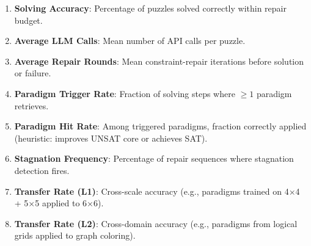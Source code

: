 \begin{enumerate}
    \item \textbf{Solving Accuracy}: Percentage of puzzles solved correctly within repair budget.
    \item \textbf{Average LLM Calls}: Mean number of API calls per puzzle.
    \item \textbf{Average Repair Rounds}: Mean constraint-repair iterations before solution or failure.
    \item \textbf{Paradigm Trigger Rate}: Fraction of solving steps where $\geq 1$ paradigm retrieves.
    \item \textbf{Paradigm Hit Rate}: Among triggered paradigms, fraction correctly applied (heuristic: improves UNSAT core or achieves SAT).
    \item \textbf{Stagnation Frequency}: Percentage of repair sequences where stagnation detection fires.
    \item \textbf{Transfer Rate (L1)}: Cross-scale accuracy (e.g., paradigms trained on 4$\times$4 + 5$\times$5 applied to 6$\times$6).
    \item \textbf{Transfer Rate (L2)}: Cross-domain accuracy (e.g., paradigms from logical grids applied to graph coloring).
\end{enumerate}
